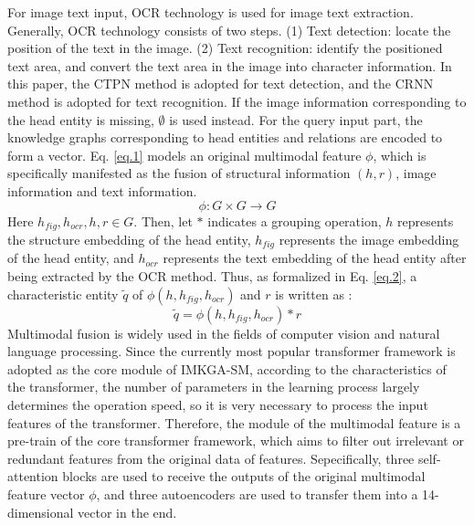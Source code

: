 \documentclass[10pt,journal,compsoc]{IEEEtran}
\begin{document}
For image text input, OCR technology is used for image text extraction\cite{ref76}. Generally, OCR technology consists of two steps. (1) Text detection: locate the position of the text in the image. (2) Text recognition: identify the positioned text area, and convert the text area in the image into character information. In this paper, the CTPN method \cite{ref47} is adopted for text detection, and the CRNN method \cite{ref48} is adopted for text recognition. If the image information corresponding to the head entity is missing, $\emptyset$ is used instead. For the query input part, the knowledge graphs corresponding to head entities and relations are encoded to form a vector. Eq. \ref{eq.1} models an original multimodal feature $\phi$, which is specifically manifested as the fusion of structural information $(h,r)$, image information and text information.
\begin{equation}\label{eq.1}
\phi :G \times G \to G
\end{equation}
Here $h_{fig},h_{ocr},h, r \in G$. Then, let $*$ indicates a grouping operation, $h$ represents the structure embedding of the head entity, $h_{fig}$ represents the image embedding of the head entity, and $h_{ocr}$ represents the text embedding of the head entity after being extracted by the OCR method. Thus, as formalized in Eq. \ref{eq.2}, a characteristic entity $\tilde q$ of $\phi(h,h_{fig},h_{ocr})$ and $r$ is written as :
\begin{equation}\label{eq.2}
\tilde q = \phi \left( {h,{h_{fig}},{h_{ocr}}} \right) * r
\end{equation}
Multimodal fusion is widely used in the fields of computer vision\cite{ref79} and natural language processing\cite{ref80}. Since the currently most popular transformer framework is adopted as the core module of IMKGA-SM, according to the characteristics of the transformer, the number of parameters in the learning process largely determines the operation speed, so it is very necessary to process the input features of the transformer. Therefore, the module of the multimodal feature is a pre-train of the core transformer framework, which aims to filter out irrelevant or redundant features from the original data of features. Sepecifically, three self-attention blocks are used to receive the outputs of the original multimodal feature vector $\phi$, and three autoencoders are used to transfer them into a 14-dimensional vector in the end.\par
\end{document}
